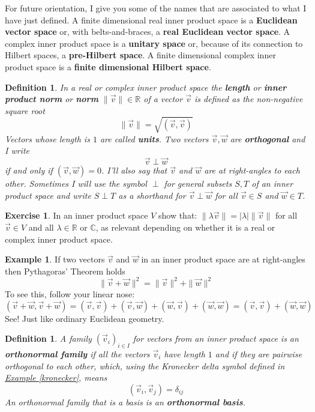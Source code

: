 \documentclass[11pt]{amsbook}
\newtheorem{definition}[theorem]{Definition}
\theoremstyle{definition}
\newtheorem{ex}[theorem]{Example}
\newtheorem{exercise}{Exercise}
\begin{document}
For future orientation, I give you some of the names that are associated to what I have just defined. A finite dimensional real inner product space is a {\bf Euclidean vector space} or, with belts-and-braces, a {\bf real Euclidean vector space}. A complex inner product space is a {\bf unitary space} or, because of its connection to Hilbert spaces, a {\bf pre-Hilbert space}. A finite dimensional complex inner product space is a {\bf finite dimensional Hilbert space}.


\begin{definition}
In a real or complex inner product space the {\bf length} or {\bf inner product norm} or {\bf norm} $\|\vec{v}\| \in \mathbb{R}$ of a vector $\vec{v}$ is defined as the non-negative square root $$\|\vec{v}\| = \sqrt{(\vec{v}, \vec{v})}$$ Vectors whose length is $1$ are called {\bf units}. Two vectors $\vec{v}, \vec{w}$ are {\bf orthogonal} and I write $$\vec{v} \perp \vec{w}$$ if and only if $( \vec{v}, \vec{w}) = 0$. I'll also say that $\vec{v}$ and $\vec{w}$ are at right-angles to each other. Sometimes I will use the symbol $\perp$ for general subsets $S,T$ of an inner product space and write $S\perp T$ as a shorthand for $\vec{v} \perp \vec{w}$ for all $\vec{v}\in S$ and $\vec{w}\in T$.
\end{definition}

\begin{exercise} \label{exlength} In an inner product space $V$ show that: $\| \lambda \vec{v} \| = |\lambda | \|\vec{v}\|$ for all $\vec{v}\in V$ and all $\lambda \in \mathbb{R}$ or $\mathbb{C}$, as relevant depending on whether it is a real or complex inner product space.
\end{exercise}

\begin{ex} \label{herecomethegreeks} If two vectors $\vec{v}$ and $\vec{w}$ in an inner product space are at right-angles then Pythagoras' Theorem holds $$\| \vec{v} + \vec{w} \|^2 = \|\vec{v}\|^2 + \|\vec{w}\|^2$$ To see this, follow your linear nose: $$( \vec{v} + \vec{w}, \vec{v} + \vec{w} ) = (\vec{v}, \vec{v}) + (\vec{v}, \vec{w}) + (\vec{w}, \vec{v}) + (\vec{w}, \vec{w}) = (\vec{v}, \vec{v}) + (\vec{w}, \vec{w})$$ See! Just like ordinary Euclidean geometry.
\end{ex}

\begin{definition} A family $(\vec{v}_i)_{i\in I}$ for vectors from an inner product space is an {\bf orthonormal family} if all the vectors $\vec{v}_i$ have length $1$ and if they are pairwise orthogonal to each other, which, using the Kronecker delta symbol defined in \hyperref[kronecker]{Example \ref{kronecker}}, means $$( \vec{v}_i, \vec{v}_j ) = \delta_{ij}$$ An orthonormal family that is a basis is an {\bf orthonormal basis}.
\end{definition}
\end{document}

